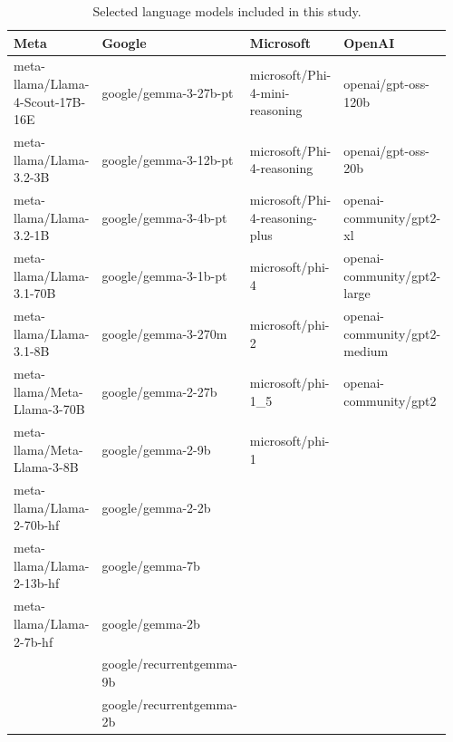 \begin{table}[H]
    \begin{tabular}{p{0.24\linewidth} p{0.24\linewidth} p{0.24\linewidth} p{0.24\linewidth}}
        \hline
        Meta & Google & Microsoft & OpenAI \\
        \hline
        meta-llama/Llama-4-Scout-17B-16E & google/gemma-3-27b-pt & microsoft/Phi-4-mini-reasoning & openai/gpt-oss-120b \\
        meta-llama/Llama-3.2-3B & google/gemma-3-12b-pt & microsoft/Phi-4-reasoning & openai/gpt-oss-20b \\
        meta-llama/Llama-3.2-1B & google/gemma-3-4b-pt & microsoft/Phi-4-reasoning-plus & openai-community/gpt2-xl \\
        meta-llama/Llama-3.1-70B & google/gemma-3-1b-pt & microsoft/phi-4 & openai-community/gpt2-large \\
        meta-llama/Llama-3.1-8B & google/gemma-3-270m & microsoft/phi-2 & openai-community/gpt2-medium \\
        meta-llama/Meta-Llama-3-70B & google/gemma-2-27b & microsoft/phi-1\_5 & openai-community/gpt2 \\
        meta-llama/Meta-Llama-3-8B & google/gemma-2-9b & microsoft/phi-1 & \\
        meta-llama/Llama-2-70b-hf & google/gemma-2-2b &  & \\
        meta-llama/Llama-2-13b-hf & google/gemma-7b &  & \\
        meta-llama/Llama-2-7b-hf & google/gemma-2b &  & \\
            & google/recurrentgemma-9b &  & \\
            & google/recurrentgemma-2b &  & \\
        \hline
    \end{tabular}
    \caption{Selected language models included in this study.}
    \label{tab:selected_models}
\end{table}

